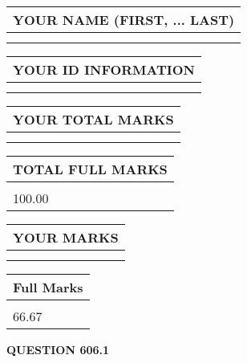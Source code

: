 \documentclass{ctexart}
\begin{document}
   
   
   
\newpage 
\setcounter{page}{ 
   606001 } 
   
   
   
   
\noindent\begin{tabular}{|l|}
\hline
YOUR NAME (FIRST, ... LAST)  \\
\hline
 \\ 
 \\ 
\hline
\end{tabular}
\hspace{0.05in} \begin{tabular}{|l|}
\hline
 YOUR   ID   INFORMATION  \\
\hline
 \\ 
 \\ 
\hline
\end{tabular}
   
   
\vspace{0.2in}\noindent\begin{tabular}{|l|}
\hline
YOUR TOTAL MARKS  \\
\hline
 \\ 
 \\ 
\hline
\end{tabular}
\hspace{0.05in} \begin{tabular}{|l|}
\hline
TOTAL FULL MARKS  \\
\hline
 \\ 
100.00 \\
\hline
\end{tabular}
   
   
 \vspace{0.2in}
 
 
 
 
   
   
  
\vspace{0.2in}
  
\noindent\begin{tabular}{|l|}
\hline
 YOUR MARKS  \\
\hline
 \\ 
 \\ 
\hline
\end{tabular}
\hspace{0.05in} \begin{tabular}{|l|}
\hline
 Full Marks  \\
\hline
 \\ 
66.67 \\
\hline
\end{tabular}
{\textbf{\Large{QUESTION
606.1 
}}}
  
\end{document}
